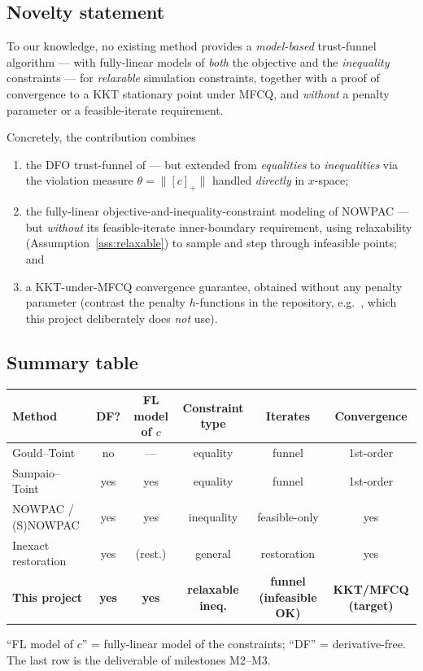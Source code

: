 \subsection{Novelty statement}
\label{sec:novelty}

To our knowledge, no existing method provides a \emph{model-based} trust-funnel
algorithm --- with fully-linear models of \emph{both} the objective and the
\emph{inequality} constraints --- for \emph{relaxable} simulation constraints,
together with a proof of convergence to a KKT stationary point under MFCQ, and
\emph{without} a penalty parameter or a feasible-iterate requirement.

\medskip\noindent
Concretely, the contribution combines
\begin{enumerate}
  \item the DFO trust-funnel of \citet{SampaioToint2015} --- but extended from
        \emph{equalities} to \emph{inequalities} via the violation measure
        $\theta=\|[c]_+\|$ handled \emph{directly} in $x$-space;
  \item the fully-linear objective-and-inequality-constraint modeling of NOWPAC
        \citep{AugustinMarzouk2017,Menhorn2022} --- but \emph{without} its
        feasible-iterate inner-boundary requirement, using relaxability
        (Assumption~\ref{ass:relaxable}) to sample and step through infeasible
        points; and
  \item a KKT-under-MFCQ convergence guarantee, obtained without any penalty
        parameter (contrast the penalty $h$-functions in the repository, e.g.\
        , which this project deliberately does \emph{not}
        use).
\end{enumerate}

\subsection{Summary table}
\label{sec:table}

\begin{center}\small
\begin{tabular}{@{}lccccc@{}}
\toprule
Method & DF? & FL model of $c$ & Constraint type & Iterates & Convergence \\
\midrule
Gould--Toint \citeyearpar{GouldToint2010}   & no  & --- & equality            & funnel  & 1st-order \\
Sampaio--Toint \citeyearpar{SampaioToint2015} & yes & yes & equality           & funnel  & 1st-order \\
NOWPAC / (S)NOWPAC                            & yes & yes & inequality          & feasible-only & yes \\
Inexact restoration \citeyearpar{Birgin2021} & yes & (rest.) & general         & restoration & yes \\
\textbf{This project}                        & \textbf{yes} & \textbf{yes} & \textbf{relaxable ineq.} & \textbf{funnel (infeasible OK)} & \textbf{KKT/MFCQ (target)} \\
\bottomrule
\end{tabular}
\end{center}

\noindent
``FL model of $c$'' = fully-linear model of the constraints; ``DF'' =
derivative-free. The last row is the deliverable of milestones M2--M3.
